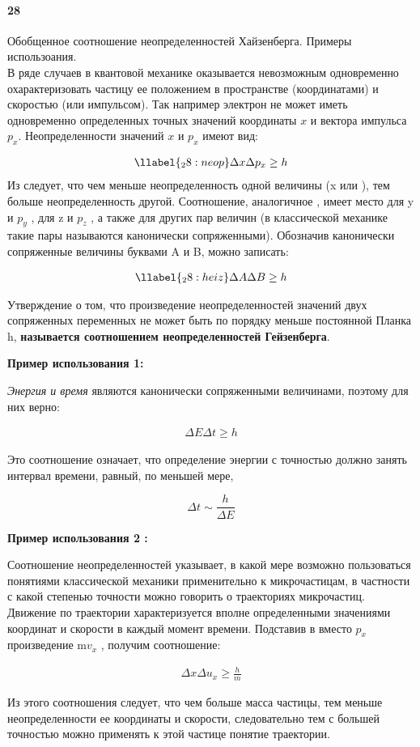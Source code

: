 

\paragraph{28}
Обобщенное соотношение неопределенностей Хайзенберга. Примеры использоания.\\

 
В ряде случаев в квантовой механике оказывается невозможным одновременно охарактеризовать частицу ее положением в пространстве (координатами) и скоростью (или импульсом). Так например электрон не может иметь одновременно определенных точных значений координаты $x$ и вектора импульса $p_{x}$. Неопределенности значений  $x$ и $p_{x}$ имеют вид:

\begin{gather}
\llabel{_28:neop}
\Delta x\Delta p_{x}\geq h
\end{gather}
Из  следует, что чем меньше неопределенность одной величины (x или   ), тем больше неопределенность другой.
Соотношение, аналогичное , имеет место для y и  $p_{y}$  , для z и  $p_{z}$  , а также для других пар величин (в классической механике такие пары называются канонически сопряженными). Обозначив канонически сопряженные величины буквами A и B, можно записать:


\begin{gather}
\llabel{_28:heiz}
\Delta A\Delta B\geq h
\end{gather}

Утверждение  о том, что произведение неопределенностей значений двух сопряженных переменных не может быть по порядку меньше постоянной Планка h, \textbf{называется соотношением неопределенностей Гейзенберга}.

\textbf{Пример использования 1:}

\textit{Энергия и время} являются канонически сопряженными величинами, поэтому для них верно:

\begin{gather}
\Delta E\Delta t\geq h
\end{gather}

Это соотношение означает, что определение энергии с точностью   должно занять интервал времени, равный, по меньшей мере,

$$
   \Delta t \sim \frac{h}{\Delta E}
$$

\textbf{Пример использования 2 :}

 Соотношение неопределенностей указывает, в какой мере возможно пользоваться понятиями классической механики применительно к микрочастицам, в частности с какой степенью точности можно говорить о траекториях микрочастиц. Движение по траектории характеризуется вполне определенными значениями координат и скорости в каждый момент времени. Подставив в  вместо $p_{x}$  произведение m$v_x$  , получим соотношение:
 
 \begin{gather}
 \Delta x\Delta u_{x}\geq \frac{h}{m}
 \end{gather}
 
  Из этого соотношения следует, что чем больше масса частицы, тем меньше неопределенности ее координаты и скорости, следовательно тем с большей точностью можно применять к этой частице понятие траектории. 
 

